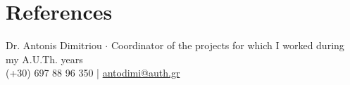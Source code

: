 \documentclass[a4paper,10pt,twoside]{article}
\begin{document}
\section{References}
\noindent Dr. Antonis Dimitriou $\cdot$ Coordinator of the projects for which I worked during my A.U.Th. years \\
  (+30) 697 88 96 350 | \href{mailto:antodimi@auth.gr}{antodimi@auth.gr} \\



\end{document}
